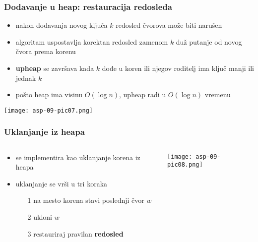 \documentclass[compress]{beamer}
\begin{document}
\begin{frame}[fragile]
  \frametitle{Dodavanje u heap: restauracija redosleda}
  \begin{itemize}
    \item nakon dodavanja novog ključa $k$ redosled čvorova može biti narušen
    \item algoritam  uspostavlja korektan redosled zamenom $k$ duž
    putanje od novog čvora prema korenu
    \item \textbf{upheap} se završava kada $k$ dođe u koren ili njegov roditelj
    ima ključ manji ili jednak $k$
    \item pošto heap ima visinu $O(\log n)$, upheap radi u $O(\log n)$ vremenu
  \end{itemize}
  \begin{center}
    \texttt{[image: asp-09-pic07.png]}
  \end{center}
\end{frame}

\begin{frame}[fragile]
  \frametitle{Uklanjanje iz heapa}
  \begin{columns}
    \begin{column}[c]{6cm}
      \begin{itemize}
        \item {} se implementira kao uklanjanje korena iz heapa
        \item uklanjanje se vrši u tri koraka
        \begin{itemize}
          \item[1] na mesto korena stavi poslednji čvor $w$
          \item[2] ukloni $w$
          \item[3] restauriraj pravilan \textbf{redosled}
        \end{itemize}
      \end{itemize}
    \end{column}
    \begin{column}[c]{5cm}
      \begin{center}
        \texttt{[image: asp-09-pic08.png]}
      \end{center}
    \end{column}
  \end{columns}
\end{frame}
\end{document}

